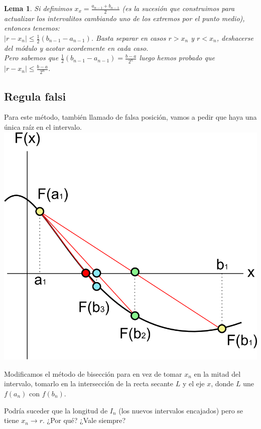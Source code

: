 \documentclass[10pt,a4paper,final]{report}
\newtheorem{lemma}{Lema}
\begin{document}
{\begin{lemma}
	Si definimos $x_x=\frac{a_{n-1}+b_{n-1}}{2}$ (es la sucesión que construimos para actualizar los intervalitos cambiando uno de los extremos por el punto medio), entonces tenemos:\\
	
	$|r-x_n|\leq \frac{1}{2}(b_{n-1}-a_{n-1})$. Basta separar en casos $r>x_n$ y $r<x_n$, deshacerse del módulo y acotar acordemente en cada caso.\\
	
	Pero sabemos que $\frac{1}{2}(b_{n-1}-a_{n-1}) = \frac{b-a}{2^n}$ luego hemos probado que $|r-x_n|\leq \frac{b-a}{2^n}$.
\end{lemma}

\subsection{Regula falsi}

Para este método, también llamado de falsa posición, vamos a pedir que haya una única raíz en el intervalo. \\

\includegraphics[scale=0.23]{regula_falsi.png}

Modificamos el método de bisección para en vez de tomar $x_n$ en la mitad del intervalo, tomarlo en la intersección de la recta secante $L$ y el eje $x$, donde $L$ une $f(a_n)$ con $f(b_n)$.

Podría suceder que la longitud de $I_n$ (los nuevos intervalos encajados) pero se tiene $x_n \to r$. ¿Por qué? ¿Vale siempre?

}
\end{document}
